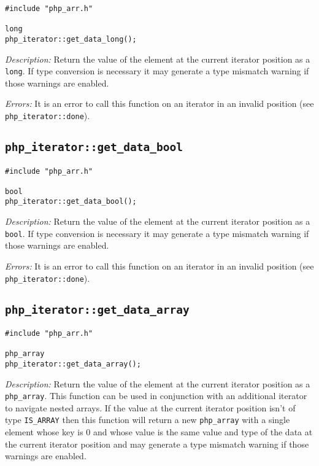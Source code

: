 \documentclass[11pt,titlepage]{article}
\begin{document}
\begin{verbatim}
#include "php_arr.h"

long 
php_iterator::get_data_long();
\end{verbatim}

\emph{Description:} Return the value of the element at the current iterator position as a \verb|long|. If type conversion is necessary it may generate a type mismatch warning if those warnings are enabled.

\emph{Errors:} It is an error to call this function on an iterator in an invalid position (see \verb|php_iterator::done|).


\subsection{\texttt{php\_iterator::get\_data\_bool}}

\begin{verbatim}
#include "php_arr.h"

bool 
php_iterator::get_data_bool();
\end{verbatim}

\emph{Description:} Return the value of the element at the current iterator position as a \verb|bool|. If type conversion is necessary it may generate a type mismatch warning if those warnings are enabled.

\emph{Errors:} It is an error to call this function on an iterator in an invalid position (see \verb|php_iterator::done|).


\subsection{\texttt{php\_iterator::get\_data\_array}}

\begin{verbatim}
#include "php_arr.h"

php_array 
php_iterator::get_data_array();
\end{verbatim}

\emph{Description:} Return the value of the element at the current iterator position as a \verb|php_array|. This function can be used in conjunction with an additional iterator to navigate nested arrays. If the value at the current iterator position isn't of type \verb|IS_ARRAY| then this function will return a new \verb|php_array| with a single element whose key is 0 and whose value is the same value and type of the data at the current iterator position and may generate a type mismatch warning if those warnings are enabled. 
\end{document}
